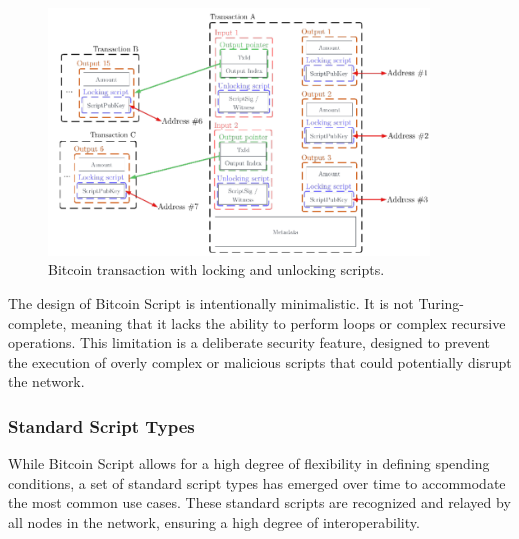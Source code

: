 \begin{figure}[t]
	\begin{center}
		\includegraphics[width=0.9\textwidth]{./figs/utxo-unlocking.png}
		\caption{Bitcoin transaction with locking and unlocking scripts.}		
		\label{fig:utxo-unlock}
	\end{center}	
\end{figure}



The design of Bitcoin Script is intentionally minimalistic. It is not
Turing-complete, meaning that it lacks the ability to perform loops or
complex recursive operations. This limitation is a deliberate security
feature, designed to prevent the execution of overly complex or
malicious scripts that could potentially disrupt the network.

\subsubsection{Standard Script Types}\label{standard-script-types}

While Bitcoin Script allows for a high degree of flexibility in defining
spending conditions, a set of standard script types has emerged over
time to accommodate the most common use cases. These standard scripts
are recognized and relayed by all nodes in the network, ensuring a high
degree of interoperability.

